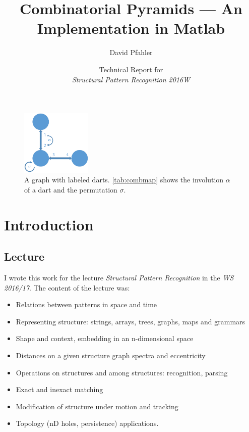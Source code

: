 \documentclass[12pt]{article}
\title{Combinatorial Pyramids --- An Implementation in Matlab}
\author{David Pfahler}
\date{Technical Report for \\ \emph{Structural Pattern Recognition 2016W}}
\newif\ifdebug
\begin{document}
\debugfalse

\maketitle

\begin{figure}[!htb]
  \centering
  \includegraphics[width=0.3\textwidth]{img/combmap.pdf}
  \caption{A graph with labeled darts. \cref{tab:combmap} shows the involution \( \alpha \) of a dart and the permutation \( \sigma \).}\label{fig:combmap}
\end{figure}

\section{Introduction}%
\label{sec:introduction}

\subsection{Lecture}%
\label{sub:lecture}

I wrote this work for the lecture \emph{Structural Pattern Recognition} in the \emph{WS 2016/17}. The content of the lecture was:
\begin{itemize}
  \item Relations between patterns in space and time
  \item Representing structure: strings, arrays, trees, graphs, maps and grammars
  \item Shape and context, embedding in an n-dimensional space
  \item Distances on a given structure graph spectra and eccentricity
  \item Operations on structures and among structures: recognition, parsing
  \item Exact and inexact matching
  \item Modification of structure under motion and tracking
  \item Topology (nD holes, persistence) applications.
\end{itemize}
\end{document}
